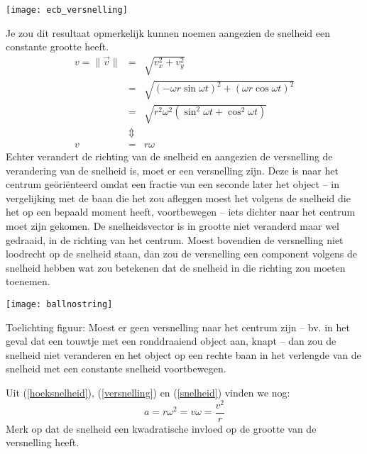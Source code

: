 \documentclass{ximera}
\begin{document}
\begin{image}
	\texttt{[image: ecb\_versnelling]}
\end{image}
Je zou dit resultaat opmerkelijk kunnen noemen aangezien de snelheid een constante grootte heeft.
\begin{eqnarray}
	v=\parallel\vec{v}\parallel&=&\sqrt{v_x^2+v_y^2}\nonumber\\
	&=&\sqrt{(-\omega r\sin\omega t)^2+(\omega r\cos\omega t)^2}\nonumber\\
	&=&\sqrt{r^2\omega^2(\sin^2\omega t+\cos^2\omega t)}\nonumber\\
	&\Updownarrow&\nonumber\\
	v&=&r\omega\label{snelheid}
\end{eqnarray}
Echter verandert de richting van de snelheid en aangezien de versnelling de verandering van de snelheid is, moet er een versnelling zijn. Deze is naar het centrum ge\"ori\"enteerd omdat een fractie van een seconde later het object -- in vergelijking met de baan die het zou afleggen moest het volgens de snelheid die het op een bepaald moment heeft, voortbewegen -- iets dichter naar het centrum moet zijn gekomen. De snelheidsvector is in grootte niet veranderd maar wel gedraaid, in de richting van het centrum. Moest bovendien de versnelling niet loodrecht op de snelheid staan, dan zou de versnelling een component volgens de snelheid hebben wat zou betekenen dat de snelheid in die richting zou moeten toenemen.
\begin{image}
	\texttt{[image: ballnostring]}
\end{image}
Toelichting figuur: Moest er geen versnelling naar het centrum zijn -- bv. in het geval dat een touwtje met een ronddraaiend object aan, knapt -- dan zou de snelheid niet veranderen en het object op een rechte baan in het verlengde van de snelheid met een constante snelheid voortbewegen.

Uit (\ref{hoeksnelheid}), (\ref{versnelling}) en (\ref{snelheid}) vinden we nog:
\begin{equation}
	a=r\omega^2=v\omega=\frac{v^2}{r}
\end{equation}
Merk op dat de snelheid een kwadratische invloed op de grootte van de versnelling heeft.
\end{document}
